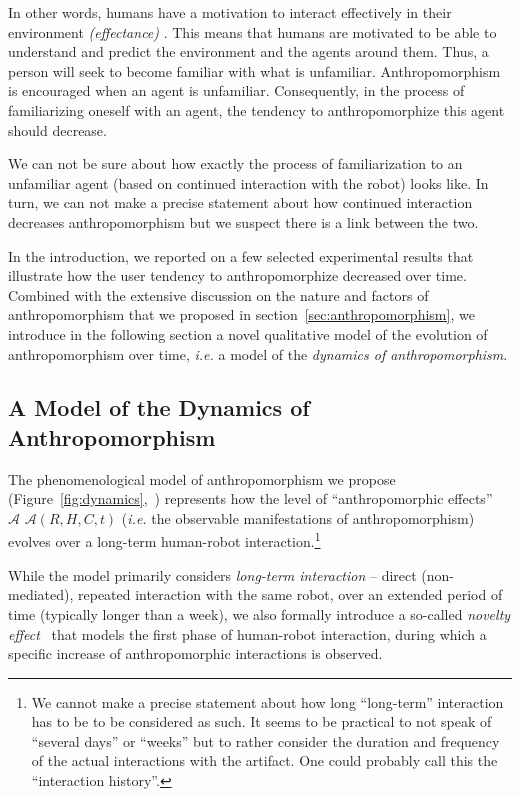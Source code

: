 \documentclass{frontiersSCNS} %
\newcommand{\ie}{\textit{i.e.}\xspace}
\newcommand{\Ant}[1][]{%
      \ifthenelse{\isempty{#1}}%
        {$\mathcal{A}$}
        {$\mathcal{A}(#1)$}
}
\begin{document}
In other words, humans have a motivation to interact effectively in their
environment \textit{(effectance)} \citep{epley_when_2008}.  This means that
humans are motivated to be able to understand and predict the environment and
the agents around them. Thus, a person will seek to become familiar with what is
unfamiliar. Anthropomorphism is encouraged when an agent is unfamiliar.
Consequently, in the process of familiarizing oneself with an agent, the
tendency to anthropomorphize this agent should decrease.

We can not be sure about how exactly the process of familiarization to an
unfamiliar agent (based on continued interaction with the robot) looks like. In
turn, we can not make a precise statement about how continued interaction
decreases anthropomorphism but we suspect there is a link between the two.

In the introduction, we reported on a few selected experimental results that
illustrate how the user tendency to anthropomorphize decreased over time.
Combined with the extensive discussion on the nature and factors of
anthropomorphism that we proposed in section~\ref{sec:anthropomorphism}, we
introduce in the following section a novel qualitative model of the evolution of
anthropomorphism over time, \ie a model of the \emph{dynamics of
anthropomorphism}.


\subsection{A Model of the Dynamics of Anthropomorphism}
\label{sec:dynamics-model}

The phenomenological model of anthropomorphism we propose
(Figure~\ref{fig:dynamics},~\citep{lemaignan2014dynamics}) represents how the
level of ``anthropomorphic effects''~\Ant[R,H,C,t] (\ie the observable
manifestations of anthropomorphism) evolves over a long-term human-robot
interaction.\footnote{We cannot make a precise statement about how long
``long-term'' interaction has to be to be considered as such. It seems to be
practical to not speak of ``several days'' or ``weeks'' but to rather consider
the duration and frequency of the actual interactions with the artifact. One
could probably call this the ``interaction history''.}

While the model primarily considers \emph{long-term interaction} -- direct
(non-mediated), repeated interaction with the same robot, over an extended
period of time (typically longer than a week), we also formally introduce a
so-called \emph{novelty effect}~\citep{kanda_interactive_2004} that models the
first phase of human-robot interaction, during which a specific increase of
anthropomorphic interactions is observed.
\end{document}
